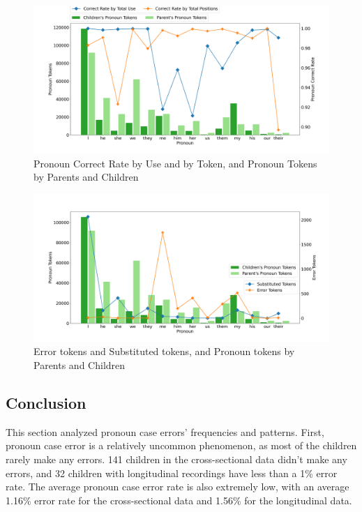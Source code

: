\FloatBarrier
\begin{figure}[!h]
    \centering
    \includegraphics[scale = 0.35]{graph/PronounandRate.png}
    \vspace{-2em}
    \caption{Pronoun Correct Rate by Use and by Token, and Pronoun Tokens by Parents and Children }
    \label{fig:corrct}
\end{figure}
\FloatBarrier
\FloatBarrier
\begin{figure}[!h]
    \centering
    \includegraphics[scale = 0.35]{graph/Pronounandtoken.png}
    \vspace{-2em}
    \caption{Error tokens and Substituted tokens, and Pronoun tokens by Parents and Children}
    \label{fig:errortoken}
\end{figure}
\FloatBarrier


\subsection{Conclusion}
This section analyzed pronoun case errors' frequencies and patterns. First, pronoun case error is a relatively uncommon phenomenon, as most of the children rarely make any errors. 141 children in the cross-sectional data didn't make any errors, and 32 children with longitudinal recordings have less than a 1\% error rate. The average pronoun case error rate is also extremely low, with an average 1.16\% error rate for the cross-sectional data and 1.56\% for the longitudinal data. 

